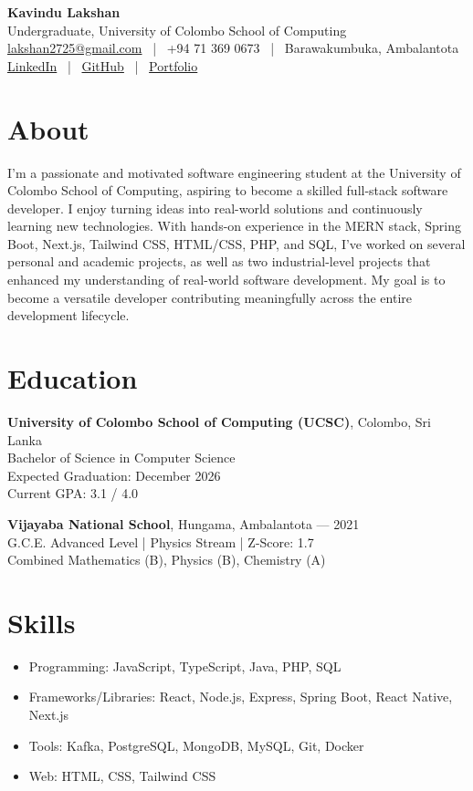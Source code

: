 \documentclass[a4paper,10pt]{article}
\begin{document}
\begin{center}
    {\LARGE \textbf{Kavindu Lakshan}} \\
    Undergraduate, University of Colombo School of Computing \\
    \href{mailto:lakshan2725@gmail.com}{lakshan2725@gmail.com} ~|~ +94 71 369 0673 ~|~ Barawakumbuka, Ambalantota \\
    \href{https://www.linkedin.com/in/kavindu-lakshan-b29091287/}{LinkedIn} ~|~
    \href{https://github.com/Lakshan102}{GitHub} ~|~
    \href{https://lakshan102.github.io/my-portfolio/}{Portfolio}
\end{center}

\vspace{-1em}

\section*{About}
I’m a passionate and motivated software engineering student at the University of Colombo School of Computing, aspiring to become a skilled full-stack software developer. I enjoy turning ideas into real-world solutions and continuously learning new technologies. With hands-on experience in the MERN stack, Spring Boot, Next.js, Tailwind CSS, HTML/CSS, PHP, and SQL, I’ve worked on several personal and academic projects, as well as two industrial-level projects that enhanced my understanding of real-world software development. My goal is to become a versatile developer contributing meaningfully across the entire development lifecycle.

\section*{Education}
\textbf{University of Colombo School of Computing (UCSC)}, Colombo, Sri Lanka \\
Bachelor of Science in Computer Science \\
Expected Graduation: December 2026 \\
Current GPA: 3.1 / 4.0

\vspace{0.5em}
\textbf{Vijayaba National School}, Hungama, Ambalantota — 2021 \\
G.C.E. Advanced Level | Physics Stream | Z-Score: 1.7 \\
Combined Mathematics (B), Physics (B), Chemistry (A)

\section*{Skills}
\begin{itemize}[leftmargin=*]
    \item Programming: JavaScript, TypeScript, Java, PHP, SQL
    \item Frameworks/Libraries: React, Node.js, Express, Spring Boot, React Native, Next.js
    \item Tools: Kafka, PostgreSQL, MongoDB, MySQL, Git, Docker
    \item Web: HTML, CSS, Tailwind CSS
\end{itemize}
\end{document}
